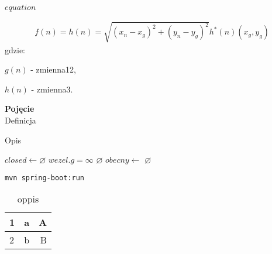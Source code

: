 $equation$

\begin{gather}
 	f(n) = h(n) = \sqrt{(x_n - x_g)^2 + (y_n - y_g)^2} h^*(n) (x_g, y_g)
 	\label{eq_astar} 
\end{gather}
 gdzie:

 $g(n)$ - zmienna12,

 $h(n)$ - zmienna3.

\begin{definition}{\bf Pojęcie\\}
	Definicja
\end{definition}

\begin{algorithm}[H]
	\caption{Opis}\label{alg:name}
  \begin{algorithmic}[1]
	\State $closed \gets \varnothing$  
		\State $wezel.g = \infty$ 
	\EndFor
	 
		\State \Return $\varnothing$ 
	\EndIf
	 
		\State $obecny \gets $  
	\EndWhile
	\State \Return $\varnothing$ 
\EndFunction
  \end{algorithmic}
\end{algorithm}

\begin{lstlisting}[language=bash]
mvn spring-boot:run
\end{lstlisting}

\begin{table}
\caption{oppis} \label{tab:name} 
\centering
\begin{tabular}{| l | c | r |}
\hline
1 & a & A \\ \hline
2 & b & B \\ \hline
\end{tabular}
\end{table}